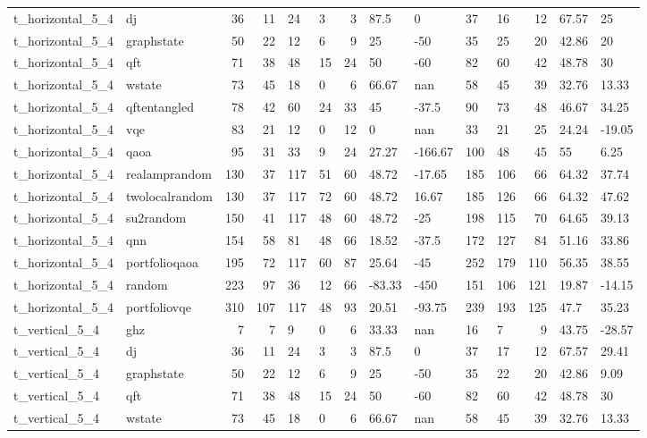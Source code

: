 \begin{longtable}{llrrllrllllrll}
t\_horizontal\_5\_4 & dj & 36 & 11 & 24 & 3 & 3 & 87.5 & 0 & 37 & 16 & 12 & 67.57 & 25 \\
t\_horizontal\_5\_4 & graphstate & 50 & 22 & 12 & 6 & 9 & 25 & -50 & 35 & 25 & 20 & 42.86 & 20 \\
t\_horizontal\_5\_4 & qft & 71 & 38 & 48 & 15 & 24 & 50 & -60 & 82 & 60 & 42 & 48.78 & 30 \\
t\_horizontal\_5\_4 & wstate & 73 & 45 & 18 & 0 & 6 & 66.67 & nan & 58 & 45 & 39 & 32.76 & 13.33 \\
t\_horizontal\_5\_4 & qftentangled & 78 & 42 & 60 & 24 & 33 & 45 & -37.5 & 90 & 73 & 48 & 46.67 & 34.25 \\
t\_horizontal\_5\_4 & vqe & 83 & 21 & 12 & 0 & 12 & 0 & nan & 33 & 21 & 25 & 24.24 & -19.05 \\
t\_horizontal\_5\_4 & qaoa & 95 & 31 & 33 & 9 & 24 & 27.27 & -166.67 & 100 & 48 & 45 & 55 & 6.25 \\
t\_horizontal\_5\_4 & realamprandom & 130 & 37 & 117 & 51 & 60 & 48.72 & -17.65 & 185 & 106 & 66 & 64.32 & 37.74 \\
t\_horizontal\_5\_4 & twolocalrandom & 130 & 37 & 117 & 72 & 60 & 48.72 & 16.67 & 185 & 126 & 66 & 64.32 & 47.62 \\
t\_horizontal\_5\_4 & su2random & 150 & 41 & 117 & 48 & 60 & 48.72 & -25 & 198 & 115 & 70 & 64.65 & 39.13 \\
t\_horizontal\_5\_4 & qnn & 154 & 58 & 81 & 48 & 66 & 18.52 & -37.5 & 172 & 127 & 84 & 51.16 & 33.86 \\
t\_horizontal\_5\_4 & portfolioqaoa & 195 & 72 & 117 & 60 & 87 & 25.64 & -45 & 252 & 179 & 110 & 56.35 & 38.55 \\
t\_horizontal\_5\_4 & random & 223 & 97 & 36 & 12 & 66 & -83.33 & -450 & 151 & 106 & 121 & 19.87 & -14.15 \\
t\_horizontal\_5\_4 & portfoliovqe & 310 & 107 & 117 & 48 & 93 & 20.51 & -93.75 & 239 & 193 & 125 & 47.7 & 35.23 \\
t\_vertical\_5\_4 & ghz & 7 & 7 & 9 & 0 & 6 & 33.33 & nan & 16 & 7 & 9 & 43.75 & -28.57 \\
t\_vertical\_5\_4 & dj & 36 & 11 & 24 & 3 & 3 & 87.5 & 0 & 37 & 17 & 12 & 67.57 & 29.41 \\
t\_vertical\_5\_4 & graphstate & 50 & 22 & 12 & 6 & 9 & 25 & -50 & 35 & 22 & 20 & 42.86 & 9.09 \\
t\_vertical\_5\_4 & qft & 71 & 38 & 48 & 15 & 24 & 50 & -60 & 82 & 60 & 42 & 48.78 & 30 \\
t\_vertical\_5\_4 & wstate & 73 & 45 & 18 & 0 & 6 & 66.67 & nan & 58 & 45 & 39 & 32.76 & 13.33 \\

\end{longtable}
